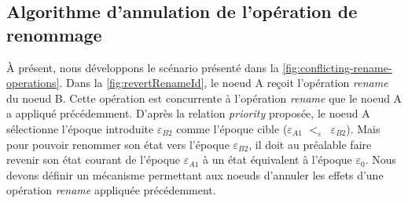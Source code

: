 \documentclass[12pt]{thesul}
\newcommand{\epoch}[1]{$\varepsilon_{#1}$}
\newcommand{\lepoch}{$<_{\varepsilon}$~}
\begin{document}
\subsection{Algorithme d'annulation de l'opération de renommage}

\label{sec:reverting-rename-ops}

À présent, nous développons le scénario présenté dans la \autoref{fig:conflicting-rename-operations}.
Dans la \autoref{fig:revertRenameId}, le noeud A reçoit l'opération \emph{rename} du noeud B.
Cette opération est concurrente à l'opération \emph{rename} que le noeud A a appliqué précédemment.
D'après la relation \emph{priority} proposée, le noeud A sélectionne l'époque introduite \epoch{B2} comme l'époque cible (\epoch{A1} \lepoch \epoch{B2}).
Mais pour pouvoir renommer son état vers l'époque \epoch{B2}, il doit au préalable faire revenir son état courant de l'époque \epoch{A1} à un état équivalent à l'époque \epoch{0}.
Nous devons définir un mécanisme permettant aux noeuds d'annuler les effets d'une opération \emph{rename} appliquée précédemment.
\end{document}
